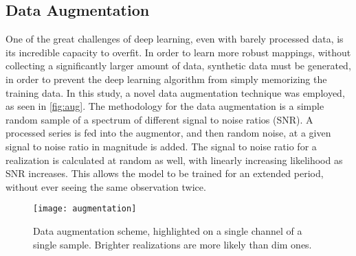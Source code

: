 \subsection{Data Augmentation}

One of the great challenges of deep learning, even with barely processed data, is its incredible capacity to overfit. In order to learn more robust mappings, without collecting a significantly larger amount of data, synthetic data must be generated, in order to prevent the deep learning algorithm from simply memorizing the training data. In this study, a novel data augmentation technique was employed, as seen in \autoref{fig:aug}. The methodology for the data augmentation is a simple random sample of a spectrum of different signal to noise ratios (SNR). A processed series is fed into the augmentor, and then random noise, at a given signal to noise ratio in magnitude is added. The signal to noise ratio for a realization is calculated at random as well, with linearly increasing likelihood as SNR increases. This allows the model to be trained for an extended period, without ever seeing the same observation twice.


\begin{figure}[h]
\caption{%
Data augmentation scheme, highlighted on a single channel of a single sample. Brighter realizations are more likely than dim ones.
}
\label{fig:aug}
\begin{center}
\texttt{[image: augmentation]}
\end{center}
\end{figure}
